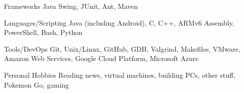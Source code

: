 

\begin{cvskills}

  \cvskill
    {Frameworks} %
    {Java Swing, JUnit, Ant, Maven} %

  \cvskill
    {Languages/Scripting} %
    {Java (including Android), C, C++, ARMv6 Assembly, PowerShell, Bash, Python} %
    
  \cvskill
    {Tools/DevOps} %
    {Git, Unix/Linux, GitHub, GDB, Valgrind, Makefiles, VMware, Amazon Web Services, Google Cloud Platform, Microsoft Azure} %

  \cvskill
  {Personal Hobbies} %
  {Reading news, virtual machines, building PCs, other stuff, Pokemon Go, gaming} %

\end{cvskills}
